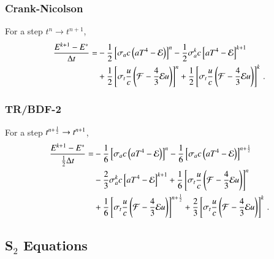 \documentclass[preprint,12pt]{elsarticle}
\begin{document}
\subsubsection{Crank-Nicolson}
For a step $t^n\rightarrow t^{n+1}$,
\begin{equation}\begin{split}
  \frac{E^{k+1}-E^*}{\Delta t} = &
  -\frac{1}{2}\left[\sigma_{a} c\left(aT^4 - \mathcal{E}\right)\right]^n
  -\frac{1}{2}\sigma_{a}^k c\left[aT^4 - \mathcal{E}\right]^{k+1}\\
  &+\frac{1}{2}\left[\sigma_{t}\frac{u}{c}\left(\mathcal{F}-\frac{4}{3}\mathcal{E} u\right)\right]^n
   +\frac{1}{2}\left[\sigma_t\frac{u}{c}\left(\mathcal{F}-\frac{4}{3}\mathcal{E} u\right)\right]^k
  \, .
\end{split}\end{equation}

\subsubsection{TR/BDF-2}
For a step $t^{n+\frac{1}{2}}\rightarrow t^{n+1}$,
\begin{equation}\begin{split}
  \frac{E^{k+1}-E^*}{\frac{1}{2}\Delta t} = &
  -\frac{1}{6}\left[\sigma_a c\left(aT^4 - \mathcal{E}\right)\right]^n
  -\frac{1}{6}\left[\sigma_a c\left(aT^4 - \mathcal{E}\right)\right]^{n+\frac{1}{2}}\\
  &-\frac{2}{3}\sigma_a^k c\left[aT^4 - \mathcal{E}\right]^{k+1}
   +\frac{1}{6}\left[\sigma_t\frac{u}{c}\left(\mathcal{F}-\frac{4}{3}\mathcal{E} u\right)\right]^n\\
  &+\frac{1}{6}\left[\sigma_t\frac{u}{c}\left(\mathcal{F}-\frac{4}{3}\mathcal{E} u\right)\right]^{n+\frac{1}{2}}
   +\frac{2}{3}\left[\sigma_t\frac{u}{c}\left(\mathcal{F}-\frac{4}{3}\mathcal{E} u\right)\right]^k
  \, .
\end{split}\end{equation}


\subsection{\texorpdfstring{S$_2$}{S-2} Equations}
\end{document}
